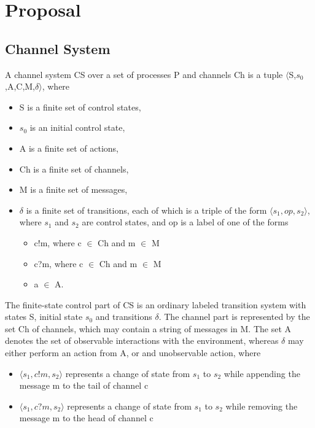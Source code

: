 \newpage
\section{Proposal}

\subsection{Channel System}
A channel system CS over a set of processes P and channels Ch is a tuple $\langle$S,$s_0$,A,C,M,$\delta$$\rangle$, where
\begin{itemize}
\item[]
S is a finite set of control states,
\item[]
$s_0$ is an initial control state,
\item[]
A is a finite set of actions,
\item[]
Ch is a finite set of channels,
\item[]
M is a finite set of messages,
\item[]
$\delta$ is a finite set of transitions, each of which is a triple of the form $\langle s_1,op,s_2\rangle$, where $s_1$ and $s_2$ are control states, and op is a label of one of the forms

\begin{itemize}
\item
c!m, where c $\in$ Ch and m $\in$ M
\item
c?m, where c $\in$ Ch and m $\in$ M
\item
a $\in$ A.
\end{itemize}
\end{itemize}

The finite-state control part of CS is an ordinary labeled transition system with states S, initial state $s_0$ and transitions $\delta$. The channel part is represented by the set Ch of channels, which may contain a string of messages in M. The set A denotes the set of observable interactions with the environment, whereas $\delta$ may either perform an action from A, or and unobservable action, where

\begin{itemize}
\item[]
$\langle s_1, c!m, s_2\rangle$ represents a change of state from $s_1$ to $s_2$ while appending the message m to the tail of channel c
\item[]
$\langle s_1, c?m, s_2\rangle$ represents a change of state from $s_1$ to $s_2$ while removing the message m to the head of channel c
\end{itemize}


